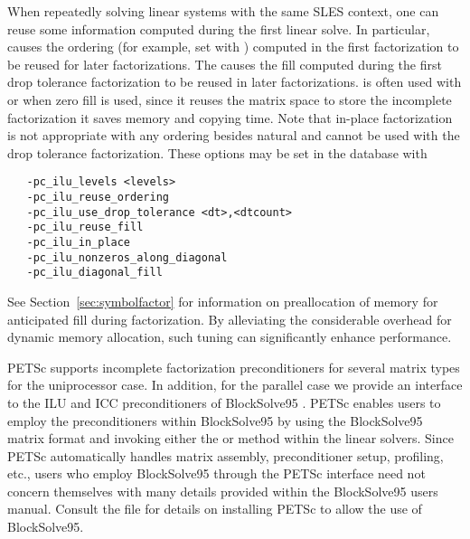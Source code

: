 When repeatedly solving linear systems with the same SLES
context, one can reuse some information  computed
during the first linear solve.
In particular,  causes the ordering  (for example, set with 
) computed in the first factorization to be reused
for later factorizations.  
The  causes the 
fill computed during the first drop tolerance factorization to be reused
in later factorizations.  is often used with 
 or  when zero fill is used, since it reuses the 
matrix space to store the incomplete factorization it saves memory and 
copying time. Note that in-place factorization is not appropriate with 
any ordering besides natural and cannot be used with the drop tolerance
factorization. These options may be set in the database with 
\begin{verbatim}
   -pc_ilu_levels <levels>
   -pc_ilu_reuse_ordering
   -pc_ilu_use_drop_tolerance <dt>,<dtcount>
   -pc_ilu_reuse_fill
   -pc_ilu_in_place
   -pc_ilu_nonzeros_along_diagonal
   -pc_ilu_diagonal_fill
\end{verbatim}
 
 
 

See Section~\ref{sec:symbolfactor} for information on preallocation
of memory for anticipated fill during factorization.
By alleviating the considerable overhead for dynamic memory allocation,
such tuning can significantly enhance performance.

PETSc supports incomplete factorization preconditioners for several matrix
types for the uniprocessor case.  
 In addition, for the parallel case
we provide an interface to the ILU and ICC preconditioners
of BlockSolve95 \cite{bs-user-ref}.   PETSc enables users
to employ the preconditioners within
BlockSolve95 by using the BlockSolve95 matrix format 
and invoking either the  or  method within the linear
solvers.  Since PETSc automatically handles matrix assembly,
preconditioner setup, profiling, etc., users who employ BlockSolve95
through the PETSc interface need not concern themselves with many
details provided within the BlockSolve95 users manual. Consult the file
 for details on installing PETSc to allow 
the use of BlockSolve95.

